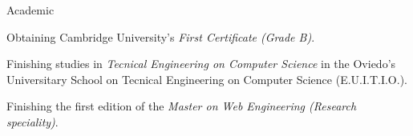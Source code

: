 
\begin{rubric}{Academic}

  \entry*[2005]
  Obtaining Cambridge University's \emph{First Certificate (Grade B)}.

  \entry*[2006]
  Finishing studies in \emph{Tecnical Engineering on Computer Science} in the Oviedo's Universitary School on Tecnical Engineering on Computer Science (E.U.I.T.I.O.).

  \entry*[2008]
  Finishing the first edition of the \emph{Master on Web Engineering (Research speciality)}.

\end{rubric}


